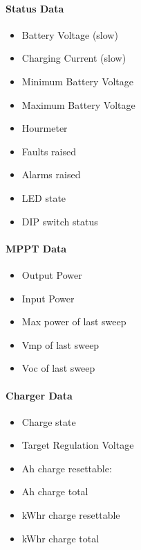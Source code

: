 \paragraph{Status Data}
\begin{itemize}
	\item Battery Voltage (slow)
	\item Charging Current (slow)
	\item Minimum Battery Voltage
	\item Maximum Battery Voltage
	\item Hourmeter
	\item Faults raised
	\item Alarms raised
	\item LED state
	\item DIP switch status
\end{itemize}
\par

\paragraph{MPPT Data}
\begin{itemize}
	\item Output Power
	\item Input Power
	\item Max power of last sweep
	\item Vmp of last sweep
	\item Voc of last sweep
\end{itemize}
\par

\paragraph{Charger Data}
\begin{itemize}
	\item Charge state
	\item Target Regulation Voltage
	\item Ah charge resettable:
	\item Ah charge total
	\item kWhr charge resettable
	\item kWhr charge total
\end{itemize}
\par

